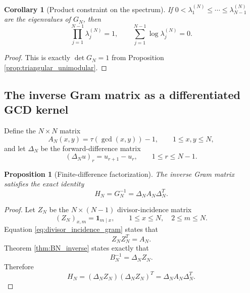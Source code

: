 \documentclass[11pt]{amsart}
\numberwithin{equation}{section}
\theoremstyle{plain}
\newtheorem{proposition}[theorem]{Proposition}
\newtheorem{corollary}[theorem]{Corollary}
\theoremstyle{definition}
\theoremstyle{remark}
\begin{document}
\begin{corollary}[Product constraint on the spectrum]
\label{cor:spectral_product}
If $0<\lambda_1^{(N)}\le\cdots\le\lambda_{N-1}^{(N)}$ are the eigenvalues of $G_N$, then
\begin{equation}
\prod_{j=1}^{N-1}\lambda_j^{(N)}=1,
\qquad
\sum_{j=1}^{N-1}\log\lambda_j^{(N)}=0.
\label{eq:spectral_product_one}
\end{equation}
\end{corollary}

\begin{proof}
This is exactly $\det G_N=1$ from Proposition \ref{prop:triangular_unimodular}.
\end{proof}

\subsection{The inverse Gram matrix as a differentiated GCD kernel}
\label{subsec:inverse_gcd_kernel}

Define the $N\times N$ matrix
\begin{equation}
A_N(x,y)=\tau(\gcd(x,y))-1,
\qquad 1\le x,y\le N,
\label{eq:gcd_kernel_A}
\end{equation}
and let $\Delta_N$ be the forward-difference matrix
\begin{equation}
(\Delta_Nu)_r=u_{r+1}-u_r,
\qquad 1\le r\le N-1.
\label{eq:forward_difference}
\end{equation}

\begin{proposition}[Finite-difference factorization]
\label{prop:finite_difference_factorization}
The inverse Gram matrix satisfies the exact identity
\begin{equation}
H_N=G_N^{-1}=\Delta_NA_N\Delta_N^T.
\label{eq:H_delta_A_delta}
\end{equation}
\end{proposition}

\begin{proof}
Let $Z_N$ be the $N\times(N-1)$ divisor-incidence matrix
\begin{equation}
(Z_N)_{x,m}=\mathbf 1_{m\mid x},
\qquad 1\le x\le N,\quad 2\le m\le N.
\end{equation}
Equation \eqref{eq:divisor_incidence_gram} states that
\begin{equation}
Z_NZ_N^T=A_N.
\end{equation}
Theorem \ref{thm:BN_inverse} states exactly that
\begin{equation}
B_N^{-1}=\Delta_NZ_N.
\end{equation}
Therefore
\begin{equation}
H_N=(\Delta_NZ_N)(\Delta_NZ_N)^T
=\Delta_NA_N\Delta_N^T.
\end{equation}
\end{proof}
\end{document}
